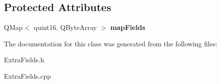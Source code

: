 \subsection*{Protected Attributes}
\begin{DoxyCompactItemize}
\item 
Q\+Map$<$ quint16, Q\+Byte\+Array $>$ {\bfseries map\+Fields}\hypertarget{class_extra_fields_ad018997adafb683c8146044945c91055}{}\label{class_extra_fields_ad018997adafb683c8146044945c91055}

\end{DoxyCompactItemize}


The documentation for this class was generated from the following files\+:\begin{DoxyCompactItemize}
\item 
Extra\+Fields.\+h\item 
Extra\+Fields.\+cpp\end{DoxyCompactItemize}
